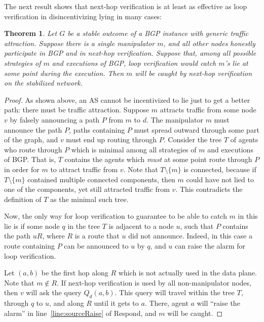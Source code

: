 \documentclass[10pt]{article}
\newtheorem{theorem}{Theorem}
\begin{document}
  The next result shows that next-hop verification is at least as
  effective as loop verification in disincentivizing lying in many cases:
  \begin{theorem}
    Let $G$ be a stable outcome of a BGP instance with generic traffic attraction.
    Suppose there is a single manipulator $m$,
    and all other nodes honestly participate in BGP and in next-hop verification.
    Suppose that, among all possible strategies of $m$ and executions of BGP,
    loop verification would catch $m$'s lie at some point during the execution.
    Then $m$ will be caught by next-hop verification on the stabilized network.
  \end{theorem}
  \begin{proof}
    As shown above, an AS cannot be incentivized to lie just to get a better
    path: there must be traffic attraction.
    Suppose $m$ attracts traffic from some node $v$ by falsely announcing a path
    $P$ from $m$ to $d$.
    The manipulator $m$ must announce the path $P$, paths containing $P$
    must spread outward through some part of the graph, and $v$ must end up
    routing through $P$.
    Consider the tree $T$ of agents who route through $P$ which is minimal among all
    strategies of $m$ and executions of BGP.
    That is, $T$ contains the agents which \emph{must} at some point route
    through $P$ in order for $m$ to attract traffic from $v$.
    Note that $T\setminus \{m\}$ is connected, because if $T\setminus \{m\}$
    contained multiple connected components, then $m$ could have not lied to one
    of the components, yet still attracted traffic from $v$.
    This contradicts the definition of $T$ as the minimal such tree.


    Now, the only way for loop verification to guarantee to be able to
    catch $m$ in this lie is if some
    node $q$ in the tree $T$ is adjacent to a node $u$, such that $P$ contains
    the path $uR$, where $R$ is a route that $u$ did not announce.
    Indeed, in this case a route containing $P$ can be announced to $u$ by $q$,
    and $u$ can raise the alarm for loop verification.

    Let $(a,b)$ be the first hop along $R$ which is not actually used in the
    data plane. Note that $m\notin R$.
    If next-hop verification is used by all non-manipulator nodes, then $v$ will
    ask the query $Q_d(a,b)$. This query will travel within the tree $T$,
    through $q$ to $u$, and along $R$ until it gets to $a$.
    There, agent $a$ will ``raise the alarm'' in line~\ref{line:sourceRaise} of {\sc
    Respond}, and $m$ will be caught.
  \end{proof}
\end{document}
